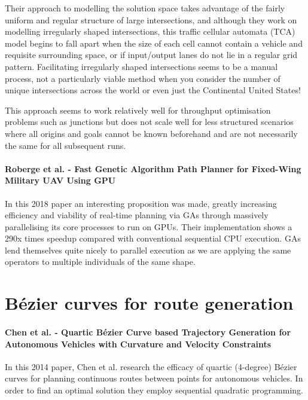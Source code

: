 Their approach to modelling the solution space takes advantage of the fairly uniform and regular structure of large intersections, and although they work on modelling irregularly shaped intersections, this traffic cellular automata (TCA) model begins to fall apart when the size of each cell cannot contain a vehicle and requisite surrounding space, or if input/output lanes do not lie in a regular grid pattern. Facilitating irregularly shaped intersections seems to be a manual process, not a particularly viable method when you consider the number of unique intersections across the world or even just the Continental United States!

This approach seems to work relatively well for throughput optimisation problems such as junctions but does not scale well for less structured scenarios where all origins and goals cannot be known beforehand and are not necessarily the same for all subsequent runs.

\paragraph{Roberge et al. - Fast Genetic Algorithm Path Planner for Fixed-Wing Military UAV Using GPU\cite{robergeFastGeneticAlgorithm2018}}

In this 2018 paper an interesting proposition was made, greatly increasing efficiency and viability of real-time planning via GAs through massively parallelising its core processes to run on GPUs. Their implementation shows a 290x times speedup compared with conventional sequential CPU execution. GAs lend themselves quite nicely to parallel execution as we are applying the same operators to multiple individuals of the same shape.

\section{Bézier curves for route generation}

\paragraph{Chen et al. - Quartic Bézier Curve based Trajectory Generation for Autonomous Vehicles with Curvature and Velocity Constraints}

In this 2014 paper, Chen et al. research the efficacy of quartic (4-degree) Bézier curves for planning continuous routes between points for autonomous vehicles. In order to find an optimal solution they employ sequential quadratic programming.

